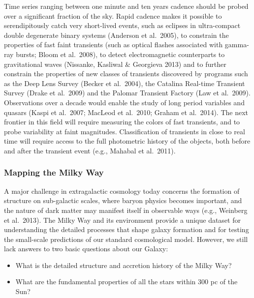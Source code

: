 \documentclass{emulateapj}
\begin{document}
Time series ranging between one minute and ten years cadence should be probed over a significant fraction of 
the sky. Rapid cadence makes it possible to serendipitously catch very short-lived events, such as eclipses in 
ultra-compact double degenerate binary systems (Anderson et al.~2005), to constrain the properties of fast faint 
transients (such as optical flashes associated with gamma-ray bursts;
Bloom et al.~2008), to detect electromagnetic counterparts to gravitational waves (Nissanke, Kasliwal \& Georgieva 2013) and to further constrain the properties 
of new classes of transients discovered by programs such as the Deep
Lens Survey (Becker et al.~2004), the Catalina Real-time Transient Survey
(Drake et  
al.~2009) and the Palomar Transient Factory (Law et
al.~2009). Observations over a decade would enable the study of long period 
variables and quasars (Kaspi et al.~2007; MacLeod et al.~2010; Graham
et al.~2014).  The next frontier in this field will require measuring
the colors of fast transients, and to probe variability at faint
magnitudes.  Classification of transients in close to real time will
require access to the full photometric history of the objects, both
before and after the transient event (e.g., Mahabal et al.~2011). 


\subsubsection{ Mapping the Milky Way}

A major challenge in extragalactic cosmology today concerns the formation of structure on sub-galactic scales, where 
baryon physics becomes important, and the nature of dark matter may manifest itself in observable ways (e.g., Weinberg 
et al.~2013). The Milky Way and its environment provide a unique dataset for understanding the detailed processes that 
shape galaxy formation and for testing the small-scale predictions of
our standard cosmological model. However, we still lack 
answers to two basic questions about our Galaxy:
\begin{itemize}
\item What is the detailed structure and accretion history of the Milky Way?
\item What are the fundamental properties of all the stars within 300 pc of the Sun?
\end{itemize}
\end{document}
